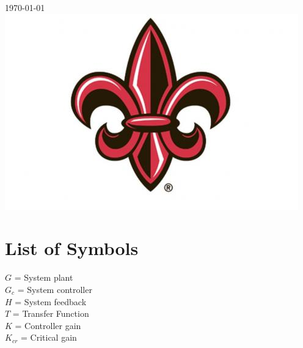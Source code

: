 \documentclass[12pt]{article}
\begin{document}
\begin{titlepage}


{\textsc{\large \today}}\\[2cm] %


\includegraphics[width=5in]{UL_logo.jpg}\\[1cm] %
 

\vfill %

\end{titlepage}


\tableofcontents

\listoffigures

\section*{\fontsize{12}{12}\selectfont \large List of Symbols}
$G$ = System plant \\
$G_{c}$ = System controller \\
$H$ = System feedback \\
$T$ = Transfer Function \\
$K$ = Controller gain \\
$K_{cr}$ = Critical gain \\
\end{document}
